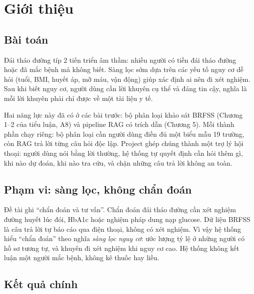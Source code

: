 \documentclass[11pt,a4paper]{article}
\begin{document}
\newpage
\tableofcontents
\newpage

\section{Giới thiệu}

\subsection{Bài toán}

Đái tháo đường típ 2 tiến triển âm thầm: nhiều người có tiền đái tháo đường hoặc đã mắc bệnh mà không biết. Sàng lọc sớm
dựa trên các yếu tố nguy cơ dễ hỏi (tuổi, BMI, huyết áp, mỡ máu, vận động) giúp xác định ai nên đi xét nghiệm. Sau khi biết
nguy cơ, người dùng cần lời khuyên cụ thể và đáng tin cậy, nghĩa là mỗi lời khuyên phải chỉ được về một tài liệu y tế.

Hai năng lực này đã có ở các bài trước: bộ phân loại khảo sát BRFSS (Chương 1--2 của tiểu luận, A8) và pipeline RAG có trích
dẫn (Chương 5). Mỗi thành phần chạy riêng: bộ phân loại cần người dùng điền đủ một biểu mẫu 19 trường, còn RAG trả lời
từng câu hỏi độc lập. Project ghép chúng thành một trợ lý hội thoại: người dùng nói bằng lời thường, hệ thống tự quyết định
cần hỏi thêm gì, khi nào dự đoán, khi nào tra cứu, và chặn những câu trả lời không an toàn.

\subsection{Phạm vi: sàng lọc, không chẩn đoán}

Đề tài ghi “chẩn đoán và tư vấn”. Chẩn đoán đái tháo đường cần xét nghiệm đường huyết lúc đói, HbA1c hoặc nghiệm pháp dung
nạp glucose. Dữ liệu BRFSS là câu trả lời tự báo cáo qua điện thoại, không có xét nghiệm. Vì vậy hệ thống hiểu “chẩn đoán”
theo nghĩa \emph{sàng lọc nguy cơ}: ước lượng tỷ lệ ở những người có hồ sơ tương tự, và khuyên đi xét nghiệm khi nguy cơ
cao. Hệ thống không kết luận một người mắc bệnh, không kê thuốc hay liều.

\subsection{Kết quả chính}

\begin{center}
\end{center}
\end{document}
